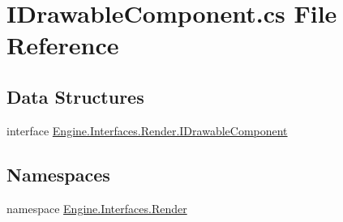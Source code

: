 \hypertarget{a00122}{}\section{I\+Drawable\+Component.\+cs File Reference}
\label{a00122}
\subsection*{Data Structures}
\begin{DoxyCompactItemize}
\item 
interface \hyperlink{a00454}{Engine.\+Interfaces.\+Render.\+I\+Drawable\+Component}
\end{DoxyCompactItemize}
\subsection*{Namespaces}
\begin{DoxyCompactItemize}
\item 
namespace \hyperlink{a00261}{Engine.\+Interfaces.\+Render}
\end{DoxyCompactItemize}

